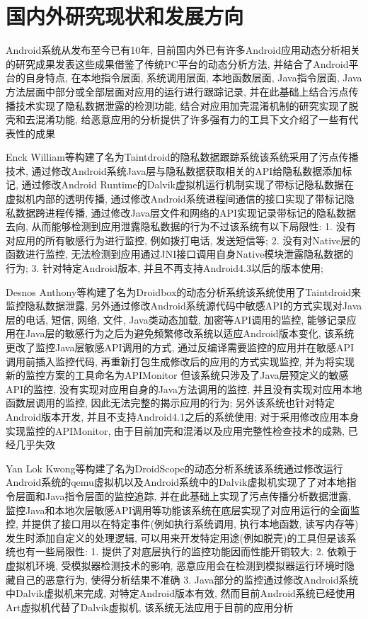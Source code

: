 \section{国内外研究现状和发展方向}
Android系统从发布至今已有10年, 目前国内外已有许多Android应用动态分析相关的研究成果发表\juhao 这些成果借鉴了传统PC平台的动态分析方法, 并结合了Android平台的自身特点, 在本地指令层面, 系统调用层面, 本地函数层面, Java指令层面, Java方法层面中部分或全部层面对应用的运行进行跟踪记录, 并在此基础上结合污点传播技术实现了隐私数据泄露的检测功能, 结合对应用加壳混淆机制的研究实现了脱壳和去混淆功能, 给恶意应用的分析提供了许多强有力的工具\juhao 下文介绍了一些有代表性的成果\juhao

Enck William等构建了名为Taintdroid的隐私数据跟踪系统\juhao 该系统采用了污点传播技术, 通过修改Android系统Java层与隐私数据获取相关的API给隐私数据添加标记, 通过修改Android Runtime的Dalvik虚拟机运行机制实现了带标记隐私数据在虚拟机内部的透明传播, 通过修改Android系统进程间通信的接口实现了带标记隐私数据跨进程传播, 通过修改Java层文件和网络的API实现记录带标记的隐私数据去向, 从而能够检测到应用泄露隐私数据的行为\juhao 不过该系统有以下局限性: 
1. 没有对应用的所有敏感行为进行监控, 例如拨打电话, 发送短信等;
2. 没有对Native层的函数进行监控, 无法检测到应用通过JNI接口调用自身Native模块泄露隐私数据的行为;
3. 针对特定Android版本, 并且不再支持Android4.3以后的版本使用;
 
Desnos Anthony等构建了名为Droidbox的动态分析系统\juhao 该系统使用了Taintdroid来监控隐私数据泄露, 另外通过修改Android系统源代码中敏感API的方式实现对Java层的电话, 短信, 网络, 文件, Java类动态加载, 加密等API调用的监控, 能够记录应用在Java层的敏感行为\juhao 之后为避免频繁修改系统以适应Android版本变化, 该系统更改了监控Java层敏感API调用的方式, 通过反编译需要监控的应用并在敏感API调用前插入监控代码, 再重新打包生成修改后的应用的方式实现监控, 并为将实现新的监控方案的工具命名为APIMonitor\juhao 
但该系统只涉及了Java层预定义的敏感API的监控, 没有实现对应用自身的Java方法调用的监控, 并且没有实现对应用本地函数层调用的监控, 因此无法完整的揭示应用的行为; 另外该系统也针对特定Android版本开发, 并且不支持Android4.1之后的系统使用; 对于采用修改应用本身实现监控的APIMonitor, 由于目前加壳和混淆以及应用完整性检查技术的成熟, 已经几乎失效\juhao

Yan Lok Kwong等构建了名为DroidScope的动态分析系统\juhao 该系统通过修改运行Android系统的qemu虚拟机以及Android系统中的Dalvik虚拟机实现了了对本地指令层面和Java指令层面的监控追踪, 并在此基础上实现了污点传播分析数据泄露, 监控Java和本地次层敏感API调用等功能\juhao 该系统在底层实现了对应用运行的全面监控, 并提供了接口用以在特定事件(例如执行系统调用, 执行本地函数, 读写内存等)发生时添加自定义的处理逻辑, 可以用来开发特定用途(例如脱壳)的工具\juhao 但是该系统也有一些局限性: 
1. 提供了对底层执行的监控功能因而性能开销较大; 
2. 依赖于虚拟机环境, 受模拟器检测技术的影响, 恶意应用会在检测到模拟器运行环境时隐藏自己的恶意行为, 使得分析结果不准确
3. Java部分的监控通过修改Android系统中Dalvik虚拟机来完成, 对特定Android版本有效, 然而目前Android系统已经使用Art虚拟机代替了Dalvik虚拟机, 该系统无法应用于目前的应用分析\juhao

